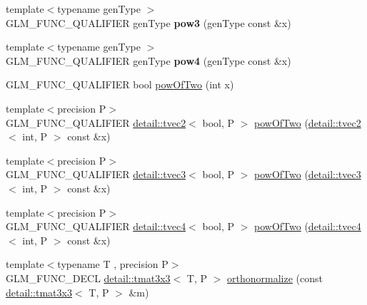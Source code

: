 \begin{DoxyCompactItemize}
\item 
{\footnotesize template$<$typename gen\+Type $>$ }\\G\+L\+M\+\_\+\+F\+U\+N\+C\+\_\+\+Q\+U\+A\+L\+I\+F\+I\+ER gen\+Type {\bfseries pow3} (gen\+Type const \&x)\hypertarget{namespaceglm_ade5a4393fe0ddfa2194642f7c9932b2d}{}\label{namespaceglm_ade5a4393fe0ddfa2194642f7c9932b2d}

\item 
{\footnotesize template$<$typename gen\+Type $>$ }\\G\+L\+M\+\_\+\+F\+U\+N\+C\+\_\+\+Q\+U\+A\+L\+I\+F\+I\+ER gen\+Type {\bfseries pow4} (gen\+Type const \&x)\hypertarget{namespaceglm_a599025fe11ed8524018284be4cae5fa2}{}\label{namespaceglm_a599025fe11ed8524018284be4cae5fa2}

\item 
G\+L\+M\+\_\+\+F\+U\+N\+C\+\_\+\+Q\+U\+A\+L\+I\+F\+I\+ER bool \hyperlink{group__gtx__optimum__pow_ga399b24df28267c1f061c462dd359affd}{pow\+Of\+Two} (int x)
\item 
{\footnotesize template$<$precision P$>$ }\\G\+L\+M\+\_\+\+F\+U\+N\+C\+\_\+\+Q\+U\+A\+L\+I\+F\+I\+ER \hyperlink{structglm_1_1detail_1_1tvec2}{detail\+::tvec2}$<$ bool, P $>$ \hyperlink{group__gtx__optimum__pow_ga2dff80972edb8f4be69e40bb27ed0a9b}{pow\+Of\+Two} (\hyperlink{structglm_1_1detail_1_1tvec2}{detail\+::tvec2}$<$ int, P $>$ const \&x)
\item 
{\footnotesize template$<$precision P$>$ }\\G\+L\+M\+\_\+\+F\+U\+N\+C\+\_\+\+Q\+U\+A\+L\+I\+F\+I\+ER \hyperlink{structglm_1_1detail_1_1tvec3}{detail\+::tvec3}$<$ bool, P $>$ \hyperlink{group__gtx__optimum__pow_ga103cbf6e3d63ab4c2bb5449e19b8639d}{pow\+Of\+Two} (\hyperlink{structglm_1_1detail_1_1tvec3}{detail\+::tvec3}$<$ int, P $>$ const \&x)
\item 
{\footnotesize template$<$precision P$>$ }\\G\+L\+M\+\_\+\+F\+U\+N\+C\+\_\+\+Q\+U\+A\+L\+I\+F\+I\+ER \hyperlink{structglm_1_1detail_1_1tvec4}{detail\+::tvec4}$<$ bool, P $>$ \hyperlink{group__gtx__optimum__pow_ga3471bc7e9e580f6b76647cb5156135cc}{pow\+Of\+Two} (\hyperlink{structglm_1_1detail_1_1tvec4}{detail\+::tvec4}$<$ int, P $>$ const \&x)
\item 
{\footnotesize template$<$typename T , precision P$>$ }\\G\+L\+M\+\_\+\+F\+U\+N\+C\+\_\+\+D\+E\+CL \hyperlink{structglm_1_1detail_1_1tmat3x3}{detail\+::tmat3x3}$<$ T, P $>$ \hyperlink{group__gtx__orthonormalize_ga2d615d8b740d7d11e583651c34103e40}{orthonormalize} (const \hyperlink{structglm_1_1detail_1_1tmat3x3}{detail\+::tmat3x3}$<$ T, P $>$ \&m)

\end{DoxyCompactItemize}
